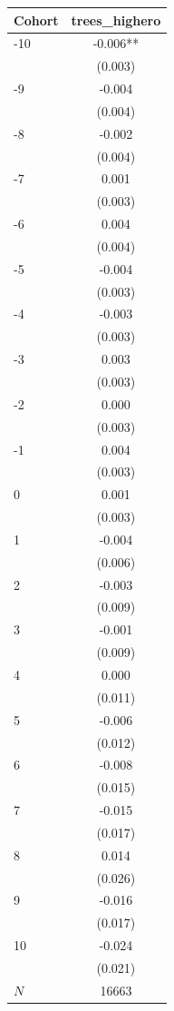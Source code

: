 {
\def\sym#1{\ifmmode^{#1}\else\(^{#1}\)\fi}
\begin{tabular}{l*{1}{c}}
\toprule
Cohort    &trees\_highero   \\
\midrule
-10       &   -0.006** \\
          &  (0.003)   \\
-9        &   -0.004   \\
          &  (0.004)   \\
-8        &   -0.002   \\
          &  (0.004)   \\
-7        &    0.001   \\
          &  (0.003)   \\
-6        &    0.004   \\
          &  (0.004)   \\
-5        &   -0.004   \\
          &  (0.003)   \\
-4        &   -0.003   \\
          &  (0.003)   \\
-3        &    0.003   \\
          &  (0.003)   \\
-2        &    0.000   \\
          &  (0.003)   \\
-1        &    0.004   \\
          &  (0.003)   \\
0         &    0.001   \\
          &  (0.003)   \\
1         &   -0.004   \\
          &  (0.006)   \\
2         &   -0.003   \\
          &  (0.009)   \\
3         &   -0.001   \\
          &  (0.009)   \\
4         &    0.000   \\
          &  (0.011)   \\
5         &   -0.006   \\
          &  (0.012)   \\
6         &   -0.008   \\
          &  (0.015)   \\
7         &   -0.015   \\
          &  (0.017)   \\
8         &    0.014   \\
          &  (0.026)   \\
9         &   -0.016   \\
          &  (0.017)   \\
10        &   -0.024   \\
          &  (0.021)   \\
\midrule
\(N\)     &    16663   \\
\bottomrule
\end{tabular}
}
